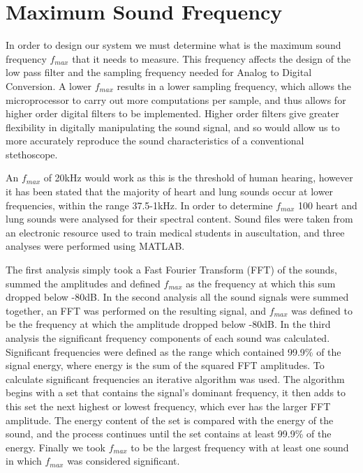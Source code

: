 \section{Maximum Sound Frequency}
In order to design our system we must determine what is the maximum sound frequency $f_{max}$ that it needs to measure. This frequency affects the design of the low pass filter and the sampling frequency needed for Analog to Digital Conversion. A lower $f_{max}$ results in a lower sampling frequency, which allows the microprocessor to carry out more computations per sample, and thus allows for higher order digital filters to be implemented. Higher order filters give greater flexibility in digitally manipulating the sound signal, and so would allow us to more accurately reproduce the sound characteristics of a conventional stethoscope.

An $f_{max}$ of 20kHz would work as this is the threshold of human hearing\cite[p.~163]{Stuart2011}, however it has been stated that the majority of heart and lung sounds occur at lower frequencies, within the range 37.5-1kHz\cite{Abella1992}. In order to determine $f_{max}$ 100 heart and lung sounds were analysed for their spectral content. Sound files were taken from an electronic resource used to train medical students in auscultation\cite{Coviello2014}, and three analyses were performed using MATLAB. 

The first analysis simply took a Fast Fourier Transform (FFT) of the sounds, summed the amplitudes and defined $f_{max}$ as the frequency at which this sum dropped below -80dB. In the second analysis all the sound signals were summed together, an FFT was performed on the resulting signal, and $f_{max}$ was defined to be the frequency at which the amplitude dropped below -80dB. In the third analysis the significant frequency components of each sound was calculated. Significant frequencies were defined as the range which contained 99.9\% of the signal energy, where energy is the sum of the squared FFT amplitudes. To calculate significant frequencies an iterative algorithm was used. The algorithm begins with a set that contains the signal's dominant frequency, it then adds to this set the next highest or lowest frequency, which ever has the larger FFT amplitude. The energy content of the set is compared with the energy of the sound, and the process continues until the set contains at least 99.9\% of the energy. Finally we took $f_{max}$ to be the largest frequency with at least one sound in which $f_{max}$ was considered significant. 


